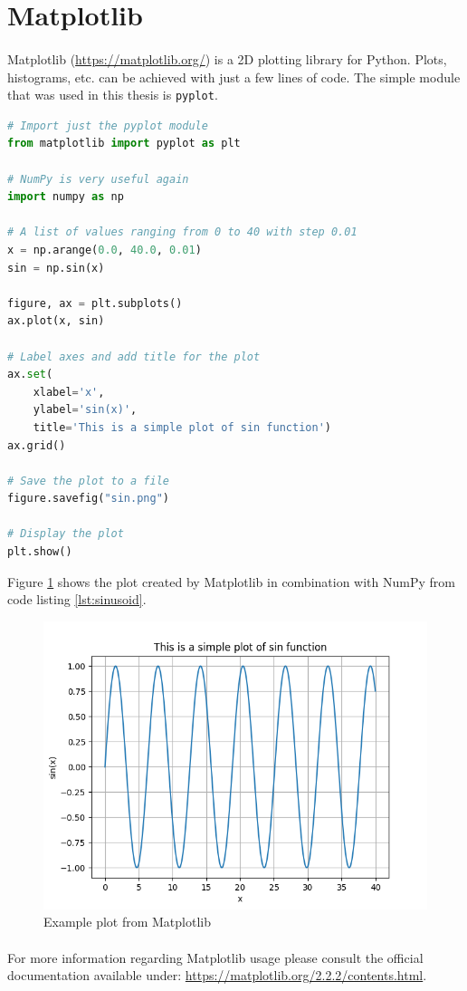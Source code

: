 \section{Matplotlib}
\paragraph{}
Matplotlib (\url{https://matplotlib.org/}) is a 2D plotting library for Python. Plots, histograms, etc. can be achieved with just a few lines of code. The simple module that was used in this thesis is \texttt{pyplot}.

\begin{lstlisting}[language=Python, caption=Example usage of Matplotlib, label={lst:sinusoid}]
# Import just the pyplot module
from matplotlib import pyplot as plt

# NumPy is very useful again
import numpy as np

# A list of values ranging from 0 to 40 with step 0.01
x = np.arange(0.0, 40.0, 0.01)
sin = np.sin(x)

figure, ax = plt.subplots()
ax.plot(x, sin)

# Label axes and add title for the plot
ax.set(
    xlabel='x',
    ylabel='sin(x)',
    title='This is a simple plot of sin function')
ax.grid()

# Save the plot to a file
figure.savefig("sin.png")

# Display the plot
plt.show()
\end{lstlisting}

Figure \ref{fig:matplotlib} shows the plot created by Matplotlib in combination with NumPy from code listing \ref{lst:sinusoid}.

\begin{figure}[H]
	\centering
	\includegraphics[width=\textwidth]{images/sin}
	\caption{Example plot from Matplotlib}
	\label{fig:matplotlib}
\end{figure}

\paragraph{}
For more information regarding Matplotlib usage please consult the official documentation available under: \url{https://matplotlib.org/2.2.2/contents.html}.